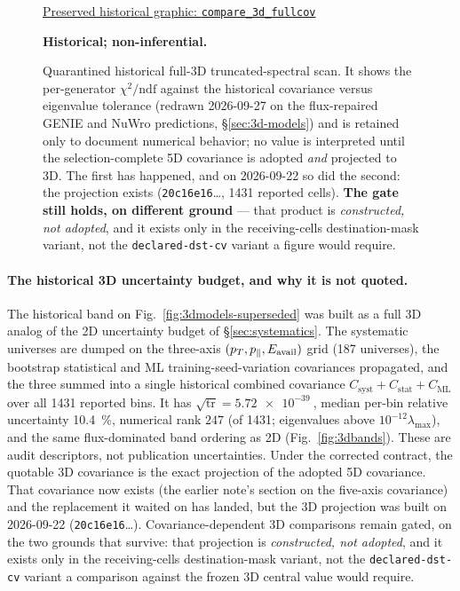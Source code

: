 \begin{figure}[H]
  \centering
  \par\href{https://github.com/josephbaileyy/MINERvA-OmniFold/blob/3892e769043cddebfd58ec19e1ab1a567eb01784/docs/analysis-note/figures/compare_3d_fullcov.pdf}{Preserved historical graphic: \texttt{compare\_3d\_fullcov}} \par\smallskip\textbf{Historical; non-inferential.}
  \caption{Quarantined historical full-3D truncated-spectral scan. It shows the per-generator $\chi^{2}/\mathrm{ndf}$ against the historical covariance versus eigenvalue tolerance (redrawn 2026-09-27 on the flux-repaired GENIE and NuWro predictions, \S\ref{sec:3d-models}) and is retained only to document numerical behavior; no value is interpreted until the selection-complete 5D covariance is adopted \emph{and} projected to 3D. The first has happened, and on 2026-09-22 so did the second: the projection exists (\texttt{20c16e16}\ldots, 1431 reported cells). \textbf{The gate still holds, on different ground} --- that product is \emph{constructed, not adopted}, and it exists only in the receiving-cells destination-mask variant, not the \texttt{declared-dst-cv} variant a figure would require.}
  \label{fig:3dfullcov}
\end{figure}

\paragraph{The historical 3D uncertainty budget, and why it is not quoted.}
\label{sec:3d-syst}
The historical band on Fig.~\ref{fig:3dmodels-superseded} was built as a full 3D analog of the 2D uncertainty budget of \S\ref{sec:systematics}. The systematic universes are dumped on the three-axis $(p_{T},p_{\parallel},E_{\mathrm{avail}})$ grid (187 universes), the bootstrap statistical and ML training-seed-variation covariances propagated, and the three summed into a single historical combined covariance $C_{\mathrm{syst}}+C_{\mathrm{stat}}+C_{\mathrm{ML}}$ over all 1431 reported bins. It has $\sqrt{\operatorname{tr}}=\SI{5.72e-39}{}$, median per-bin relative uncertainty \SI{10.4}{\percent}, numerical rank $247$ (of 1431; eigenvalues above $10^{-12}\lambda_{\max}$), and the same flux-dominated band ordering as 2D (Fig.~\ref{fig:3dbands}). These are audit descriptors, not publication uncertainties. Under the corrected contract, the quotable 3D covariance is the exact projection of the adopted 5D covariance. That covariance now exists (the earlier note's section on the five-axis covariance) and the replacement it waited on has landed, but the 3D projection was built on 2026-09-22 (\texttt{20c16e16}\ldots). Covariance-dependent 3D comparisons remain gated, on the two grounds that survive: that projection is \emph{constructed, not adopted}, and it exists only in the receiving-cells destination-mask variant, not the \texttt{declared-dst-cv} variant a comparison against the frozen 3D central value would require.

